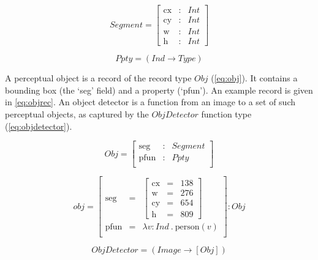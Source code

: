 \begin{equation}\label{eq:seg}
Segment = \left[\begin{array}{rcl}
\text{cx} &:& Int\\
\text{cy} &:& Int\\
\text{w} &:& Int\\
\text{h} &:& Int
\end{array}\right]\end{equation}

\begin{equation}\label{eq:ppty}
Ppty = (Ind \rightarrow Type)\end{equation}


A perceptual object is a record of the record type $Obj$ (\autoref{eq:obj}).
It contains a bounding box (the `seg' field) and a property (`pfun').
An example record is given in \autoref{eq:objrec}.
An object detector is a function from an image to a set of such perceptual objects, as captured by the $ObjDetector$ function type (\autoref{eq:objdetector}).


\begin{equation}\label{eq:obj}
Obj = \left[\begin{array}{rcl}
\text{seg} &:& Segment\\
\text{pfun} &:& Ppty \\
\end{array}\right]\end{equation}

\begin{equation}\label{eq:objrec}
obj =
\left[\begin{array}{rcl}
\text{seg} &=& \left[\begin{array}{rcl}
\text{cx} &=& 138\\
\text{w} &=& 276\\
\text{cy} &=& 654\\
\text{h} &=& 809
\end{array}\right]\\
\text{pfun} &=& \lambda v:Ind\ .\ \text{person}(v)\\
\end{array}\right] : Obj\end{equation}

\begin{equation}\label{eq:objdetector}
ObjDetector = ( Image \rightarrow [Obj] )
\end{equation}



